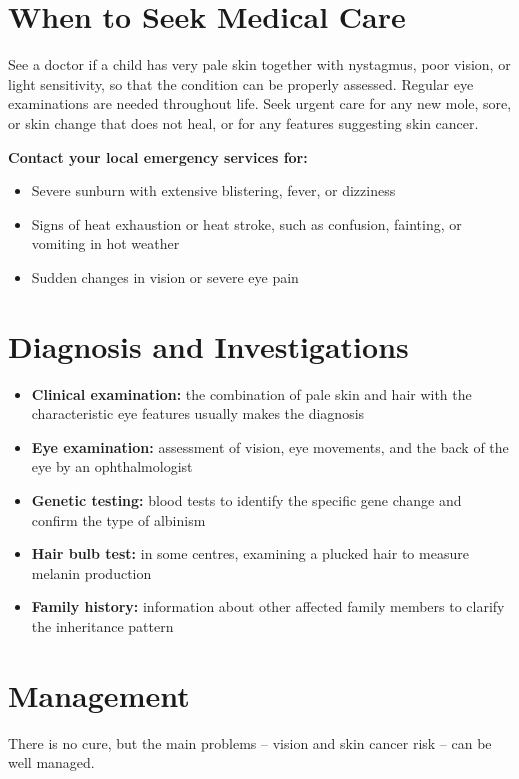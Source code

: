 \section*{When to Seek Medical Care}
See a doctor if a child has very pale skin together with nystagmus, poor vision, or light sensitivity, so that the condition can be properly assessed. Regular eye examinations are needed throughout life. Seek urgent care for any new mole, sore, or skin change that does not heal, or for any features suggesting skin cancer.

\textbf{Contact your local emergency services for:}
\begin{itemize}
    \item Severe sunburn with extensive blistering, fever, or dizziness
    \item Signs of heat exhaustion or heat stroke, such as confusion, fainting, or vomiting in hot weather
    \item Sudden changes in vision or severe eye pain
\end{itemize}

\section*{Diagnosis and Investigations}
\begin{itemize}
    \item \textbf{Clinical examination:} the combination of pale skin and hair with the characteristic eye features usually makes the diagnosis
    \item \textbf{Eye examination:} assessment of vision, eye movements, and the back of the eye by an ophthalmologist
    \item \textbf{Genetic testing:} blood tests to identify the specific gene change and confirm the type of albinism
    \item \textbf{Hair bulb test:} in some centres, examining a plucked hair to measure melanin production
    \item \textbf{Family history:} information about other affected family members to clarify the inheritance pattern
\end{itemize}

\section*{Management}
There is no cure, but the main problems -- vision and skin cancer risk -- can be well managed.

